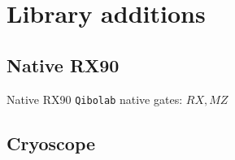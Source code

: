 \documentclass[aspectratio=169,10pt]{beamer}
\begin{document}
%  

\section{Library additions}

\subsection{Native RX90}

\begin{frame}{Native RX90}
  \centering
  \texttt{Qibolab} native gates: $ RX, MZ$
\end{frame}

\subsection{Cryoscope}
\end{document}
